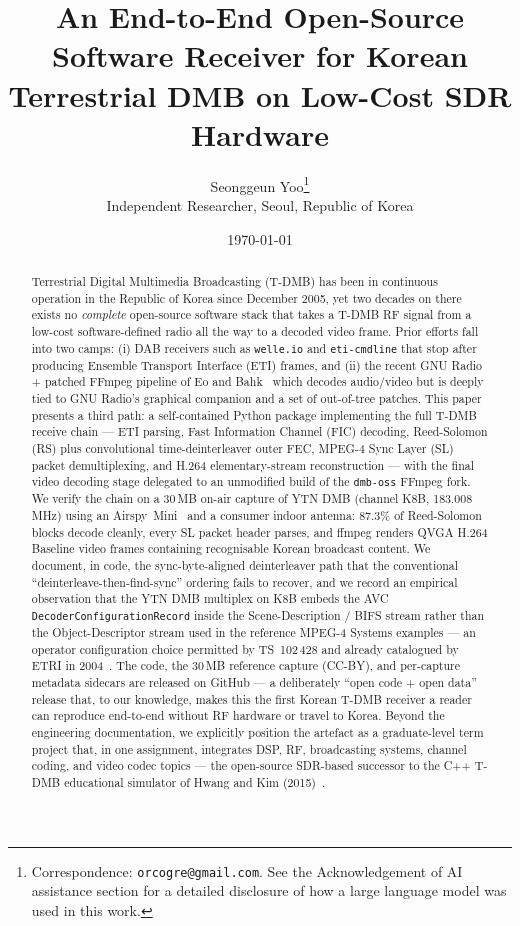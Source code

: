 \documentclass[11pt,a4paper]{article}
\title{An End-to-End Open-Source Software Receiver for Korean
       Terrestrial DMB on Low-Cost SDR Hardware}
\author{%
  Seonggeun Yoo\thanks{Correspondence:
    \texttt{orcogre@gmail.com}.  See the Acknowledgement of AI
    assistance section for a detailed disclosure of how a large
    language model was used in this work.}\\
  \small Independent Researcher, Seoul, Republic of Korea\\
}
\date{\today}
\begin{document}
\maketitle

\begin{abstract}
Terrestrial Digital Multimedia Broadcasting (T-DMB) has been in continuous
operation in the Republic of Korea since December 2005, yet two decades on
there exists no \emph{complete} open-source software stack that takes a
T-DMB RF signal from a low-cost software-defined radio all the way to a
decoded video frame.  Prior efforts fall into two camps: (i) DAB receivers
such as \texttt{welle.io} and \texttt{eti-cmdline} that stop after producing
Ensemble Transport Interface (ETI) frames, and (ii) the recent GNU Radio +
patched FFmpeg pipeline of Eo and Bahk~\cite{eo2024tdmb} which decodes
audio/video but is deeply tied to GNU Radio's graphical companion and a set
of out-of-tree patches.  This paper presents a third path: a self-contained
Python package implementing the full T-DMB receive chain --- ETI parsing,
Fast Information Channel (FIC) decoding, Reed-Solomon (RS) plus
convolutional time-deinterleaver outer FEC, MPEG-4 Sync Layer (SL) packet
demultiplexing, and H.264 elementary-stream reconstruction --- with the
final video decoding stage delegated to an unmodified build of the
\texttt{dmb-oss} FFmpeg fork.  We verify the chain on a 30\,MB
on-air capture of YTN DMB (channel K8B, 183.008\,MHz) using an
Airspy~Mini~\cite{airspy} and a consumer indoor antenna: 87.3\% of
Reed-Solomon blocks decode cleanly, every SL packet header parses, and
ffmpeg renders QVGA H.264 Baseline video frames containing recognisable
Korean broadcast content.  We document, in code, the
sync-byte-aligned deinterleaver path that the conventional
``deinterleave-then-find-sync'' ordering fails to recover, and we
record an empirical observation that the YTN DMB multiplex on K8B
embeds the AVC \texttt{DecoderConfigurationRecord} inside the
Scene-Description / BIFS stream rather than the
Object-Descriptor stream used in the reference MPEG-4 Systems
examples --- an operator configuration choice permitted by
TS~102\,428 and already catalogued by ETRI in
2004~\cite{lee2004m4smux}.
The code, the 30\,MB reference capture (CC-BY), and per-capture
metadata sidecars are released on GitHub --- a deliberately
``open code + open data'' release that, to our knowledge, makes
this the first Korean T-DMB receiver a reader can reproduce
end-to-end without RF hardware or travel to Korea.  Beyond the engineering documentation, we explicitly position
the artefact as a graduate-level term project that, in one assignment,
integrates DSP, RF, broadcasting systems, channel coding, and video
codec topics --- the open-source SDR-based successor to the C++
T-DMB educational simulator of Hwang and Kim
(2015)~\cite{hwang2015simulator}.
\end{abstract}
\end{document}
